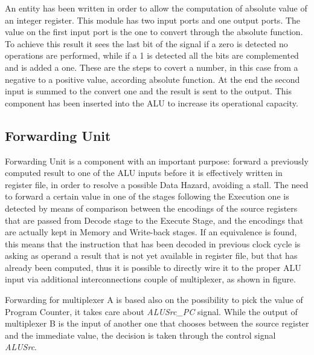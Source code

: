 An entity has been written in order to allow the computation of absolute value of an integer register.
This module has two input ports and one output ports. The value on the first input port is the one to convert 
through the absolute function. To achieve this result it sees the last bit of the signal if a zero is detected 
no operations are performed, while if a 1 is detected all the bits are complemented and is added a one. 
These are the steps to covert a number, in this case from a negative to a positive value, according absolute function.
At the end the second input is summed to the convert one and the result is sent to the output.
This component has been inserted into the ALU to increase its operational capacity.

\subsection{Forwarding Unit}

Forwarding Unit is a component with an important purpose: forward a previously computed result to one of the ALU inputs
before it is effectively written in register file, in order to resolve a possible Data Hazard, avoiding a stall.
The need to forward a certain value in one of the stages following the Execution one is detected by means of comparison between the encodings of the source registers 
that are passed from Decode stage to the Execute Stage, and the encodings that are actually kept in Memory and Write-back stages.
If an equivalence is found, this means that the instruction that has been decoded in previous clock cycle is asking as operand a result that is not yet available 
in register file, but that has already been computed, thus it is possible to directly wire it to the proper ALU input via additional interconnections
couple of multiplexer, as shown in figure.  

Forwarding for multiplexer A is based also on the possibility to pick the value of Program Counter, it takes care about \textit{ALUSrc\_PC} signal.
While the output of multiplexer B is the input of another one that chooses between the source register and the immediate value, the decision is 
taken through the control signal \textit{ALUSrc}. 

